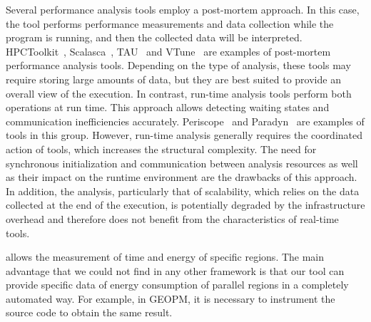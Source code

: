 Several performance analysis tools employ a post-mortem approach. 
In this case, the tool performs performance measurements and data collection while the program is running, and then the collected data will be interpreted.
HPCToolkit~\cite{Adhianto2010}, Scalasca~\cite{Geimer2010}, TAU~\cite{Shende2006} and VTune~\cite{Intel2021Vtune} are examples of post-mortem performance analysis tools. 
Depending on the type of analysis, these tools may require storing large amounts of data, but they are best suited to provide an overall view of the execution.
In contrast, run-time analysis tools perform both operations at run time.
This approach allows detecting waiting states and communication inefficiencies accurately. 
Periscope~\cite{Gerndt2010} and Paradyn~\cite{Miller1995} are examples of tools in this group.
However, run-time analysis generally requires the coordinated action of tools, which increases the structural complexity.
The need for synchronous initialization and communication between analysis resources as well as their impact on the runtime environment are the drawbacks of this approach.
In addition, the analysis, particularly that of scalability, which relies on the data collected at the end of the execution, is potentially degraded by the infrastructure overhead and therefore does not benefit from the characteristics of real-time tools.


 allows the measurement of time and energy of specific regions. The main advantage that we could not find in any other framework is that our tool can provide specific data of energy consumption of parallel regions in a completely automated way. For example, in GEOPM, it is necessary to instrument the source code to obtain the same result.

